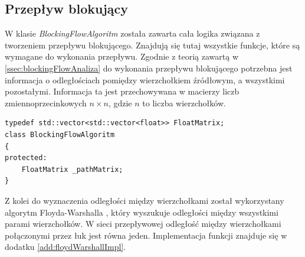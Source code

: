 \subsection{Przepływ blokujący}\label{ssec:blockingFlowWew}
W klasie \emph{BlockingFlowAlgoritm} została zawarta cała logika związana z tworzeniem przepływu blokującego. Znajdują się tutaj wszystkie funkcje, które są wymagane do wykonania przepływu. Zgodnie z teorią zawartą w \ref{ssec:blockingFlowAnaliza} do wykonania przepływu blokującego potrzebna jest informacja o odległościach pomiędzy wierzchołkiem źródłowym, a wszystkimi pozostałymi. Informacja ta jest przechowywana w macierzy liczb zmiennoprzecinkowych $ n\times n $, gdzie $ n $ to liczba wierzchołków.
\begin{verbatim}
typedef std::vector<std::vector<float>> FloatMatrix;
class BlockingFlowAlgoritm
{
protected:
	FloatMatrix _pathMatrix;
}
\end{verbatim}
Z kolei do wyznaczenia odległości między wierzchołkami został wykorzystany algorytm Floyda-Warshalla \cite{id:AlgorytmyStrukturyFloydWarshall}, który wyszukuje odległości między wszystkimi parami wierzchołków. W sieci przepływowej odległość między wierzchołkami połączonymi przez łuk jest równa jeden. Implementacja funkcji znajduje się w dodatku \ref{add:floydWarshallImpl}.

